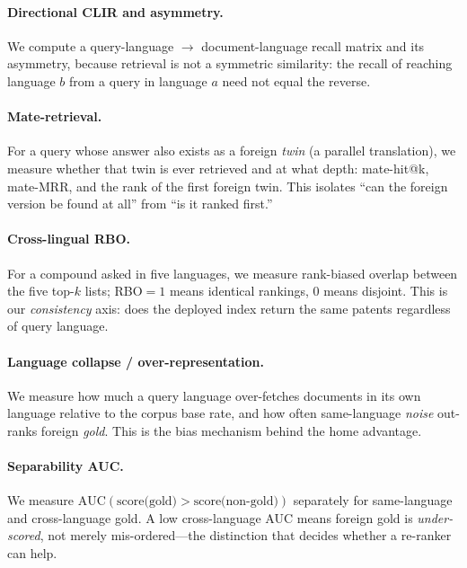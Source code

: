 \documentclass[11pt]{article}
\begin{document}
\paragraph{Directional CLIR and asymmetry.}
We compute a query-language $\rightarrow$ document-language recall matrix and
its asymmetry, because retrieval is not a symmetric similarity: the recall of
reaching language $b$ from a query in language $a$ need not equal the reverse.

\paragraph{Mate-retrieval.}
For a query whose answer also exists as a foreign \emph{twin} (a parallel
translation), we measure whether that twin is ever retrieved and at what depth:
mate-hit@k, mate-MRR, and the rank of the first foreign twin. This isolates
``can the foreign version be found at all'' from ``is it ranked first.''

\paragraph{Cross-lingual RBO.}
For a compound asked in five languages, we measure rank-biased overlap
\citep{rbo2010} between the five top-$k$ lists; RBO$=1$ means identical
rankings, $0$ means disjoint. This is our \emph{consistency} axis: does the
deployed index return the same patents regardless of query language.

\paragraph{Language collapse / over-representation.}
We measure how much a query language over-fetches documents in its own
language relative to the corpus base rate, and how often same-language
\emph{noise} out-ranks foreign \emph{gold}. This is the bias mechanism behind
the home advantage.

\paragraph{Separability AUC.}
We measure $\mathrm{AUC}(\text{score(gold)} > \text{score(non-gold)})$
separately for same-language and cross-language gold. A low cross-language AUC
means foreign gold is \emph{under-scored}, not merely mis-ordered---the
distinction that decides whether a re-ranker can help.
\end{document}
